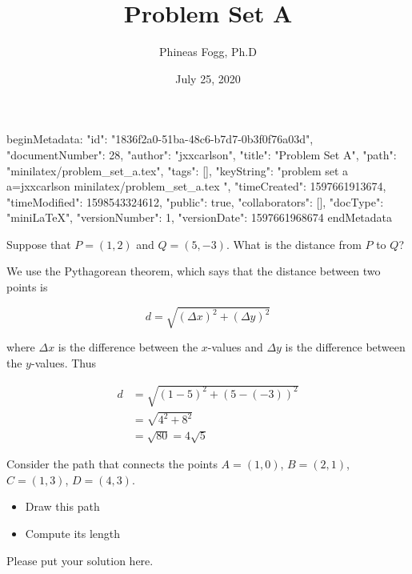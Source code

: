 beginMetadata:
{
    "id": "1836f2a0-51ba-48c6-b7d7-0b3f0f76a03d",
    "documentNumber": 28,
    "author": "jxxcarlson",
    "title": "Problem Set A",
    "path": "minilatex/problem_set_a.tex",
    "tags": [],
    "keyString": "problem set a a=jxxcarlson minilatex/problem_set_a.tex ",
    "timeCreated": 1597661913674,
    "timeModified": 1598543324612,
    "public": true,
    "collaborators": [],
    "docType": "miniLaTeX",
    "versionNumber": 1,
    "versionDate": 1597661968674
}
endMetadata
\title{Problem Set A}
\author{Phineas Fogg, Ph.D}
\date{July 25, 2020}


\maketitle


\begin{problem}
Suppose that $P = (1,2)$ and $Q = (5,-3)$.  What is the distance from $P$ to $Q$?
\end{problem}

\begin{solution}
We use the Pythagorean theorem, which says that the distance between two points is

\begin{equation}
d = \sqrt{(\Delta x)^2 + (\Delta y)^2}
\end{equation}

where $\Delta x$ is the difference between the $x$-values and $\Delta y$ is the difference between the $y$-values.  Thus

\begin{align}
d &= \sqrt{(1 - 5)^2 + (5 - (-3))^2} \\
  &= \sqrt{4^2 + 8^2} \\
  &= \sqrt{80} = 4\sqrt{5}
\end{align}

\end{solution}

\begin{problem}
Consider the path that connects the points $A = (1,0)$,
$B = (2,1)$, $C = (1,3)$, $D = (4,3)$.

\medskip
\begin{itemize}
\item Draw this path
\item Compute its length
\end{itemize}
\end{problem}

\begin{solution}
Please put your solution here.
\end{solution}


